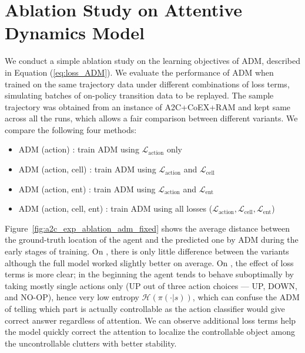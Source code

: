 \documentclass{article} \usepackage{iclr,times}
\begin{document}
{ 




\clearpage


\FloatBarrier

\section{Ablation Study on Attentive Dynamics Model}
\label{sec:ablation_adm}

We conduct a simple ablation study on the learning objectives of ADM, described in Equation (\ref{eq:loss_ADM}).
We evaluate the performance of ADM when trained on the same trajectory data under different combinations of loss terms,
simulating batches of on-policy transition data to be replayed.
The sample trajectory was obtained from an instance of A2C+CoEX+RAM and kept same across all the runs,
which allows a fair comparison between different variants.
We compare the following four methods:
\begin{itemize}[leftmargin=7mm]
\setlength{\itemsep}{0pt}\setlength{\parskip}{3pt}
\item ADM (action)             : train ADM using $\mathcal L_\text{action}$ only
\item ADM (action, cell)       : train ADM using $\mathcal L_\text{action}$ and $\mathcal L_\text{cell}$
\item ADM (action, ent)        : train ADM using $\mathcal L_\text{action}$ and $\mathcal L_\text{ent}$
\item ADM (action, cell, ent)  : train ADM using all losses ($\mathcal L_\text{action}, \mathcal L_\text{cell}, \mathcal L_\text{ent}$)
\end{itemize}


Figure~\ref{fig:a2c_exp_ablation_adm_fixed} shows the average distance
between the ground-truth location of the agent and the predicted one by ADM
during the early stages of training.
On \MontezumaRevenge, there is only little difference between the variants
although the full model worked slightly better on average.
On \Freeway, the effect of loss terms is more clear;
in the beginning
the agent tends to behave suboptimally by taking mostly single actions only
(UP out of three action choices --- UP, DOWN, and NO-OP),
hence very low entropy $\mathcal H(\pi(\cdot|s))$,
which can confuse the ADM of telling
which part is actually controllable
as the action classifier would give correct answer regardless of attention.
We can observe additional loss terms help the model
quickly correct the attention to localize the controllable object among the uncontrollable clutters
with better stability.



}
\end{document}
